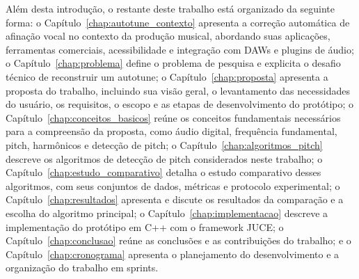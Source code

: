 Além desta introdução, o restante deste trabalho está organizado da seguinte forma: o Capítulo~\ref{chap:autotune_contexto} apresenta a correção automática de afinação vocal no contexto da produção musical, abordando suas aplicações, ferramentas comerciais, acessibilidade e integração com DAWs e plugins de áudio; o Capítulo~\ref{chap:problema} define o problema de pesquisa e explicita o desafio técnico de reconstruir um autotune; o Capítulo~\ref{chap:proposta} apresenta a proposta do trabalho, incluindo sua visão geral, o levantamento das necessidades do usuário, os requisitos, o escopo e as etapas de desenvolvimento do protótipo; o Capítulo~\ref{chap:conceitos_basicos} reúne os conceitos fundamentais necessários para a compreensão da proposta, como áudio digital, frequência fundamental, pitch, harmônicos e detecção de pitch; o Capítulo~\ref{chap:algoritmos_pitch} descreve os algoritmos de detecção de pitch considerados neste trabalho; o Capítulo~\ref{chap:estudo_comparativo} detalha o estudo comparativo desses algoritmos, com seus conjuntos de dados, métricas e protocolo experimental; o Capítulo~\ref{chap:resultados} apresenta e discute os resultados da comparação e a escolha do algoritmo principal; o Capítulo~\ref{chap:implementacao} descreve a implementação do protótipo em C++ com o framework JUCE; o Capítulo~\ref{chap:conclusao} reúne as conclusões e as contribuições do trabalho; e o Capítulo~\ref{chap:cronograma} apresenta o planejamento do desenvolvimento e a organização do trabalho em sprints.